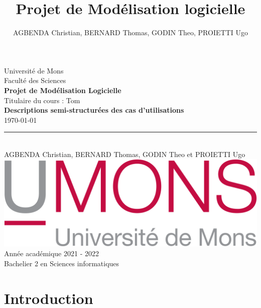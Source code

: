 \documentclass[french, a4paper, 12pt]{article}
\begin{document}
\nocite{*}

\begin{titlepage}
\begin{center}

Université de Mons\\Faculté des Sciences \\ \vspace{5mm}
\textbf{Projet de Modélisation Logicielle} \\ \vspace{5mm}
Titulaire du cours : Tom  \\        \vspace{25mm}
\LARGE{\textbf{Descriptions semi-structurées des cas d'utilisations }\\            \vspace{2mm}
}
\small{\today}\\
\rule{10cm}{3pt}\\                           \vspace{10mm}
\LARGE{AGBENDA Christian, BERNARD Thomas, GODIN Theo et PROIETTI Ugo  \bsc{}  \bsc{} } \\
\vspace{50mm}
\includegraphics[scale=0.25]{UMons.png}\\
\vspace{20pt}
Année académique 2021 - 2022\\
Bachelier 2 en Sciences informatiques\\
\end{center}

\end{titlepage}

\title{Projet de Modélisation logicielle}
\author{AGBENDA Christian, BERNARD Thomas, GODIN Theo, PROIETTI Ugo}
\maketitle
\tableofcontents
\newpage


\section{Introduction}
\end{document}
